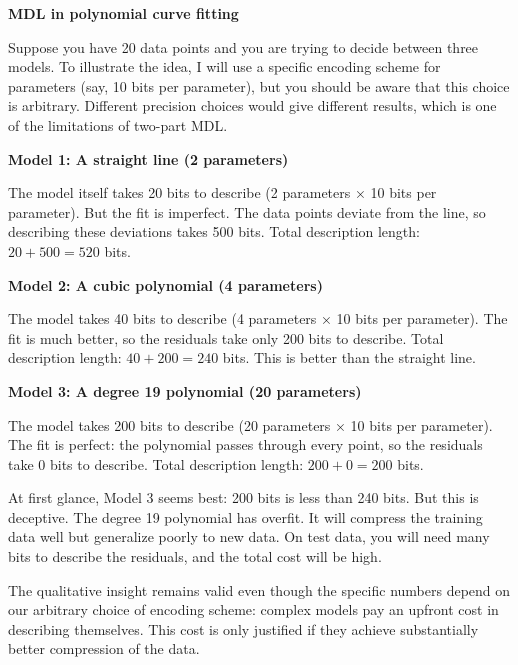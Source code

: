 \begin{examplebox}
\textbf{MDL in polynomial curve fitting}

\vspace{0.5em}

Suppose you have 20 data points and you are trying to decide between three models. To illustrate the idea, I will use a specific encoding scheme for parameters (say, 10 bits per parameter), but you should be aware that this choice is arbitrary. Different precision choices would give different results, which is one of the limitations of two-part MDL.

\vspace{0.5em}

\textbf{Model 1: A straight line (2 parameters)}

The model itself takes 20 bits to describe (2 parameters × 10 bits per parameter). But the fit is imperfect. The data points deviate from the line, so describing these deviations takes 500 bits. Total description length: $20 + 500 = 520$ bits.

\vspace{0.5em}

\textbf{Model 2: A cubic polynomial (4 parameters)}

The model takes 40 bits to describe (4 parameters × 10 bits per parameter). The fit is much better, so the residuals take only 200 bits to describe. Total description length: $40 + 200 = 240$ bits. This is better than the straight line.

\vspace{0.5em}

\textbf{Model 3: A degree 19 polynomial (20 parameters)}

The model takes 200 bits to describe (20 parameters × 10 bits per parameter). The fit is perfect: the polynomial passes through every point, so the residuals take 0 bits to describe. Total description length: $200 + 0 = 200$ bits.

\vspace{0.5em}

At first glance, Model 3 seems best: 200 bits is less than 240 bits. But this is deceptive. The degree 19 polynomial has overfit. It will compress the training data well but generalize poorly to new data. On test data, you will need many bits to describe the residuals, and the total cost will be high.

\vspace{0.5em}

The qualitative insight remains valid even though the specific numbers depend on our arbitrary choice of encoding scheme: complex models pay an upfront cost in describing themselves. This cost is only justified if they achieve substantially better compression of the data.
\end{examplebox}

